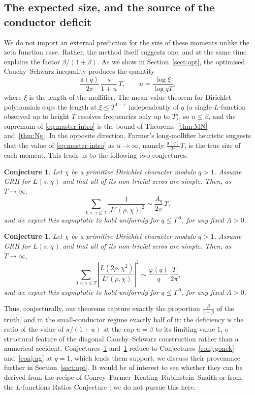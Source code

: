 \documentclass[12pt,a4paper,reqno]{amsart}
\newtheorem{conjecture}[theorem]{Conjecture}
\theoremstyle{remark}
\numberwithin{equation}{section}
\begin{document}
\subsection{The expected size, and the source of the conductor deficit}\label{subsect:expected}
We do not import an external prediction for the size of these moments unlike the zeta function case. Rather, the method itself suggests one, and at the same time explains the factor $\beta/(1+\beta)$. As we show in Section~\ref{sect:opt}, the optimised Cauchy--Schwarz inequality produces the quantity
\begin{equation}\label{eq:master-intro}
\frac{\mathfrak a(q)}{2\pi}\,\frac{u}{1+u}\,T,
\qquad
u=\frac{\log\xi}{\log qT},
\end{equation}
where $\xi$ is the length of the mollifier. The mean value theorem for Dirichlet polynomials caps the length at $\xi\le T^{1-\varepsilon}$ independently of $q$ (a single $L$-function observed up to height $T$ resolves frequencies only up to $T$), so $u\le\beta$, and the supremum of \eqref{eq:master-intro} is the bound of Theorems~\ref{thm:MN} and~\ref{thm:Ng}. In the opposite direction, Farmer's long-mollifier heuristic \cite{Farmer} suggests that the value of \eqref{eq:master-intro} as $u\to\infty$, namely $\tfrac{\mathfrak a(q)}{2\pi}T$, is the true size of each moment. This leads us to the following two conjectures.

\begin{conjecture}\label{conj:dirMN}
Let $\chi$ be a primitive Dirichlet character modulo $q>1$. Assume GRH for $L(s,\chi)$ and that all of its non-trivial zeros are simple. Then, as $T\to\infty$,
\[
\sum_{0<\gamma\le T}\frac{1}{|L'(\rho,\chi)|^2}\sim\frac{A_q}{2\pi}\,T,
\]
and we expect this asymptotic to hold uniformly for $q\le T^{A}$, for any fixed $A>0$.
\end{conjecture}

\begin{conjecture}\label{conj:dirNg}
Let $\chi$ be a primitive Dirichlet character modulo $q>1$. Assume GRH for $L(s,\chi)$ and that all of its non-trivial zeros are simple. Then, as $T\to\infty$,
\[
\sum_{0<\gamma\le T}\left|\frac{L(2\rho,\chi^2)}{L'(\rho,\chi)}\right|^2\sim\frac{\varphi(q)}{q}\,\frac{T}{2\pi},
\]
and we expect this asymptotic to hold uniformly for $q\le T^{A}$, for any fixed $A>0$.
\end{conjecture}

Thus, conjecturally, our theorems capture exactly the proportion $\tfrac{\beta}{1+\beta}$ of the truth, and in the small-conductor regime exactly half of it: the deficiency is the ratio of the value of $u/(1+u)$ at the cap $u=\beta$ to its limiting value $1$, a structural feature of the diagonal Cauchy--Schwarz construction rather than a numerical accident. Conjectures~\ref{conj:dirMN} and~\ref{conj:dirNg} reduce to Conjectures~\ref{conj:gonek} and~\ref{conj:ng} at $q=1$, which lends them support; we discuss their provenance further in Section~\ref{sect:opt}. It would be of interest to see whether they can be derived from the recipe of Conrey--Farmer--Keating--Rubinstein--Snaith \cite{CFKRS} or from the $L$-functions Ratios Conjecture \cite{CFZ,ConreySnaith}; we do not pursue this here.
\end{document}
